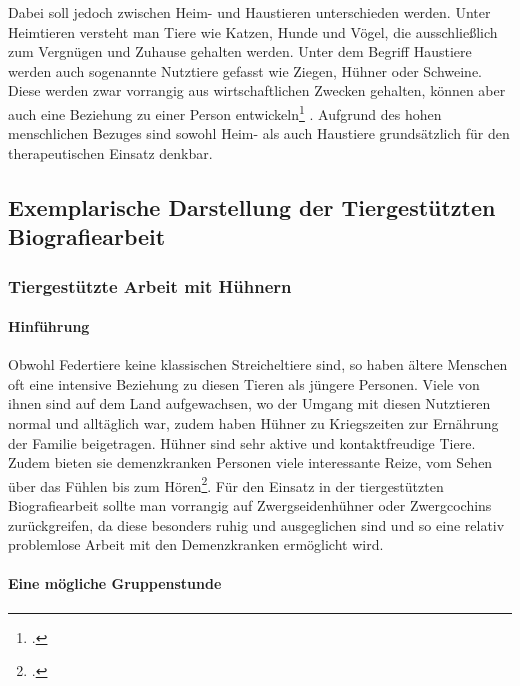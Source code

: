 Dabei soll jedoch zwischen Heim- und Haustieren unterschieden werden. Unter Heimtieren versteht man Tiere wie Katzen, Hunde und Vögel, die ausschließlich zum Vergnügen und Zuhause gehalten werden. Unter dem Begriff Haustiere werden auch sogenannte Nutztiere gefasst wie Ziegen, Hühner oder Schweine. Diese werden zwar vorrangig aus wirtschaftlichen Zwecken gehalten, können aber auch eine Beziehung zu einer Person entwickeln\footcite[47f]{Leder2006} . Aufgrund des hohen menschlichen Bezuges sind sowohl Heim- als auch Haustiere grundsätzlich für den therapeutischen Einsatz denkbar.

\subsection{Exemplarische Darstellung der Tiergestützten Biografiearbeit}
\label{sec:k4.3_ExemplarischeDarstellungDerTiergestütztenBiografiearbeit}

\subsubsection{Tiergestützte Arbeit mit Hühnern}
\label{sec:k4.3.1_TiergestützteArbeitMitHühnern}

\paragraph{Hinführung}
\label{sec:k4.3.1.1_Hinfuehrung}

Obwohl Federtiere keine klassischen Streicheltiere sind, so haben ältere Menschen oft eine intensive Beziehung zu diesen Tieren als jüngere Personen. Viele von ihnen sind auf dem Land aufgewachsen, wo der Umgang mit diesen Nutztieren normal und alltäglich war, zudem haben Hühner zu Kriegszeiten zur Ernährung der Familie beigetragen. 
Hühner sind sehr aktive und kontaktfreudige Tiere. Zudem bieten sie demenzkranken Personen viele interessante Reize, vom Sehen über das Fühlen bis zum Hören\footcite[33f]{Giruc2011}. Für den Einsatz in der tiergestützten Biografiearbeit sollte man vorrangig auf Zwergseidenhühner oder Zwergcochins zurückgreifen, da diese besonders ruhig und ausgeglichen sind und so eine relativ problemlose Arbeit mit den Demenzkranken ermöglicht wird.

\paragraph{Eine mögliche Gruppenstunde}
\label{sec:k4.3.1.2_EineMöglicheGruppenstunde}

